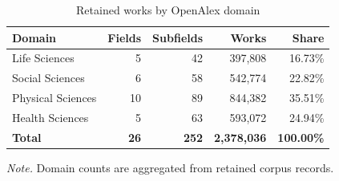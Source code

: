 \begin{table}[H]
\centering
\caption{Retained works by OpenAlex domain}
\label{tab:domain_distribution}
\footnotesize
\begin{tabular}{lrrrr}
\hline
\textbf{Domain} & \textbf{Fields} & \textbf{Subfields} & \textbf{Works} & \textbf{Share} \\
\hline
Life Sciences & 5 & 42 & 397,808 & 16.73\% \\
Social Sciences & 6 & 58 & 542,774 & 22.82\% \\
Physical Sciences & 10 & 89 & 844,382 & 35.51\% \\
Health Sciences & 5 & 63 & 593,072 & 24.94\% \\
\hline
\textbf{Total} & \textbf{26} & \textbf{252} & \textbf{2,378,036} & \textbf{100.00\%} \\
\hline
\end{tabular}
\par\vspace{0.2cm}
\footnotesize\textit{Note.} Domain counts are aggregated from retained corpus records.
\end{table}
